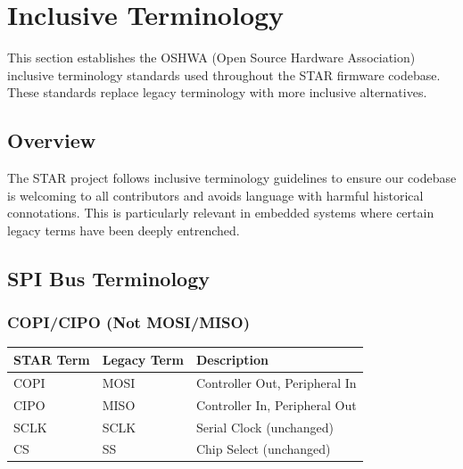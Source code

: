 \section{Inclusive Terminology}

This section establishes the OSHWA (Open Source Hardware Association) inclusive terminology standards used throughout the STAR firmware codebase. These standards replace legacy terminology with more inclusive alternatives.

\subsection{Overview}

The STAR project follows inclusive terminology guidelines to ensure our codebase is welcoming to all contributors and avoids language with harmful historical connotations. This is particularly relevant in embedded systems where certain legacy terms have been deeply entrenched.

\subsection{SPI Bus Terminology}

\subsubsection{COPI/CIPO (Not MOSI/MISO)}

\begin{center}
\begin{tabular}{|l|l|l|}
\hline
\textbf{STAR Term} & \textbf{Legacy Term} & \textbf{Description} \\
\hline
COPI & MOSI & Controller Out, Peripheral In \\
\hline
CIPO & MISO & Controller In, Peripheral Out \\
\hline
SCLK & SCLK & Serial Clock (unchanged) \\
\hline
CS & SS & Chip Select (unchanged) \\
\hline
\end{tabular}
\end{center}

